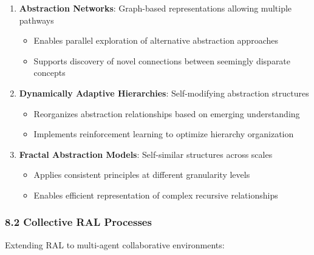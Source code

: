 \documentclass[
]{article}
\providecommand{\tightlist}{%
  \setlength{\itemsep}{0pt}\setlength{\parskip}{0pt}}
\begin{document}
\begin{enumerate}
\def\labelenumi{\arabic{enumi}.}
\tightlist
\item
  \textbf{Abstraction Networks}: Graph-based representations allowing
  multiple pathways

  \begin{itemize}
  \tightlist
  \item
    Enables parallel exploration of alternative abstraction approaches
  \item
    Supports discovery of novel connections between seemingly disparate
    concepts
  \end{itemize}
\item
  \textbf{Dynamically Adaptive Hierarchies}: Self-modifying abstraction
  structures

  \begin{itemize}
  \tightlist
  \item
    Reorganizes abstraction relationships based on emerging
    understanding
  \item
    Implements reinforcement learning to optimize hierarchy organization
  \end{itemize}
\item
  \textbf{Fractal Abstraction Models}: Self-similar structures across
  scales

  \begin{itemize}
  \tightlist
  \item
    Applies consistent principles at different granularity levels
  \item
    Enables efficient representation of complex recursive relationships
  \end{itemize}
\end{enumerate}

\subsubsection{8.2 Collective RAL
Processes}\label{collective-ral-processes}

Extending RAL to multi-agent collaborative environments:
\end{document}
